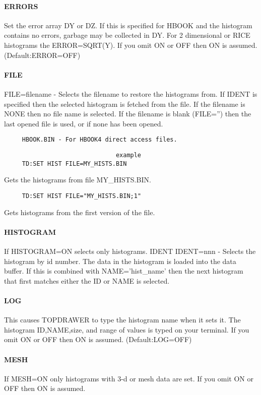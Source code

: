 \paragraph{ERRORS}
Set the error array DY or DZ.  If this is specified for HBOOK and the
histogram contains no errors, garbage may be collected in DY.  For  2
dimensional  or RICE histograms the ERROR=SQRT(Y).  If you omit ON or
OFF then ON is assumed.  (Default:ERROR=OFF) 
\paragraph{FILE}
FILE=filename  - Selects the filename to restore the histograms from.
If IDENT is specified then the selected histogram is fetched from the
file.  If the filename is NONE then no file name is selected.  If the
filename is blank (FILE='') then the last opened file is used, or  if
none has been opened.  
\begin{verbatim}
     HBOOK.BIN - For HBOOK4 direct access files.  
\end{verbatim}

\begin{verbatim}
                               example
     TD:SET HIST FILE=MY_HISTS.BIN 
\end{verbatim}
Gets the histograms from file MY\_HISTS.BIN.  
\begin{verbatim}
     TD:SET HIST FILE="MY_HISTS.BIN;1" 
\end{verbatim}
Gets histograms from the first version of the file.  
\paragraph{HISTOGRAM}
If  HISTOGRAM=ON  selects only histograms.  IDENT IDENT=nnn - Selects
the histogram by id number.  The data in the histogram is loaded into
the  data buffer.  If this is combined with NAME='hist\_name' then the
next histogram that first matches either the ID or NAME is selected. 
\paragraph{LOG}
This  causes  TOPDRAWER  to  type the histogram name when it sets it.
The histogram ID,NAME,size, and range of  values  is  typed  on  your
terminal.    If   you   omit   ON   or   OFF   then  ON  is  assumed.
(Default:LOG=OFF) 
\paragraph{MESH}
If  MESH=ON  only  histograms  with 3-d or mesh data are set.  If you
omit ON or OFF then ON is assumed.  

